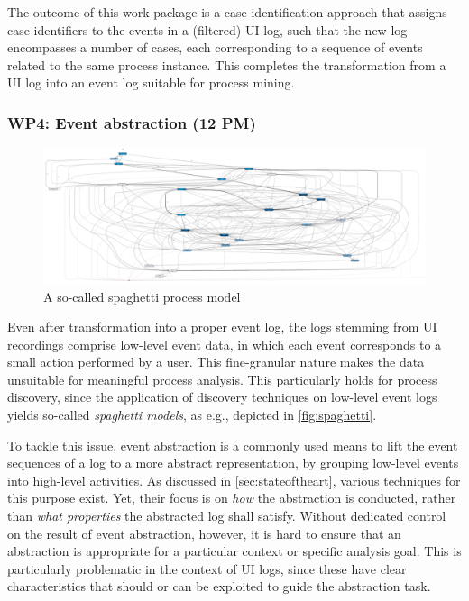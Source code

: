 The outcome of this work package is a case identification approach that assigns case identifiers to the events in a (filtered) UI log, such that the new log encompasses a number of cases, each corresponding to a sequence of events related to the same process instance. This completes the transformation from a UI log into an event log suitable for process mining.


\subsubsection{WP4: Event abstraction (12 PM)}
\label{sec:wp4}

\begin{figure} 
	\vspace{-15pt}
	\begin{center}
		\includegraphics[width=\linewidth]{figures/spaghettiprocess.png}
		\caption{A so-called spaghetti process model}
		\label{fig:spaghetti}
	\end{center}
	\vspace{-15pt}
	\vspace{1pt}
\end{figure} 
Even after transformation into a proper event log, the logs stemming from UI recordings comprise low-level event data, in which each event corresponds to a small action performed by a user. This fine-granular nature makes the data unsuitable for meaningful process analysis. This particularly holds for process discovery, since the application of discovery techniques on low-level event logs yields so-called \emph{spaghetti models}, as e.g., depicted in \autoref{fig:spaghetti}.



To tackle this issue, event abstraction is a commonly used means to lift the event sequences of a log to a more abstract representation, by grouping low-level events into high-level activities. 
As discussed in \autoref{sec:stateoftheart}, various techniques for this purpose exist. Yet, their focus is on \emph{how} the abstraction is conducted, rather than \emph{what properties} the abstracted log shall satisfy. Without dedicated control on the result of event abstraction, however, it is hard to ensure that an abstraction is appropriate for a particular context or specific analysis goal.
This is particularly problematic in the context of UI logs, since these have clear characteristics that should or can be exploited to guide the abstraction task.



